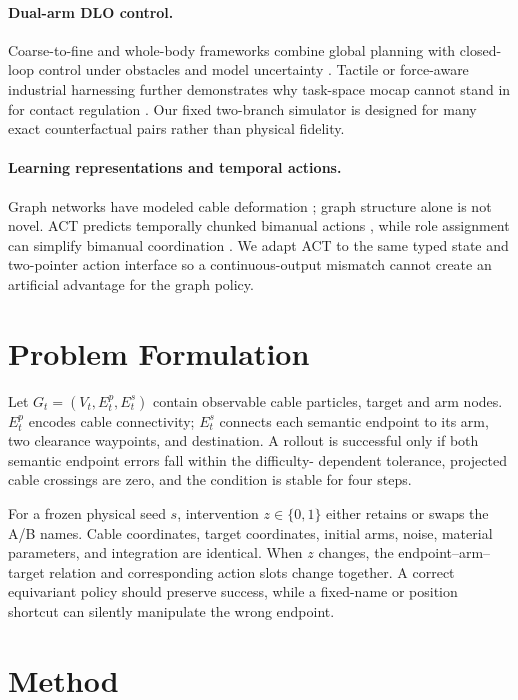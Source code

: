 \documentclass[journal]{IEEEtran}
\begin{document}
\paragraph{Dual-arm DLO control.}
Coarse-to-fine and whole-body frameworks combine global planning with
closed-loop control under obstacles and model uncertainty
\cite{yu2022coarse,yu2023wholebody}.  Tactile or force-aware industrial
harnessing further demonstrates why task-space mocap cannot stand in for
contact regulation \cite{zhang2024twisting}.  Our fixed two-branch simulator
is designed for many exact counterfactual pairs rather than physical fidelity.

\paragraph{Learning representations and temporal actions.}
Graph networks have modeled cable deformation \cite{wang2022offlineonline};
graph structure alone is not novel.  ACT predicts temporally chunked bimanual
actions \cite{zhao2023act}, while role assignment can simplify bimanual
coordination \cite{grannen2023stabilize}.  We adapt ACT to the same typed state
and two-pointer action interface so a continuous-output mismatch cannot create
an artificial advantage for the graph policy.

\section{Problem Formulation}

Let $G_t=(V_t,E_t^p,E_t^s)$ contain observable cable particles, target and arm
nodes.  $E_t^p$ encodes cable connectivity; $E_t^s$ connects each semantic
endpoint to its arm, two clearance waypoints, and destination.  A rollout is
successful only if both semantic endpoint errors fall within the difficulty-
dependent tolerance, projected cable crossings are zero, and the condition is
stable for four steps.

For a frozen physical seed $s$, intervention $z\in\{0,1\}$ either retains or
swaps the A/B names.  Cable coordinates, target coordinates, initial arms,
noise, material parameters, and integration are identical.  When $z$ changes,
the endpoint--arm--target relation and corresponding action slots change
together.  A correct equivariant policy should preserve success, while a
fixed-name or position shortcut can silently manipulate the wrong endpoint.

\section{Method}
\end{document}
